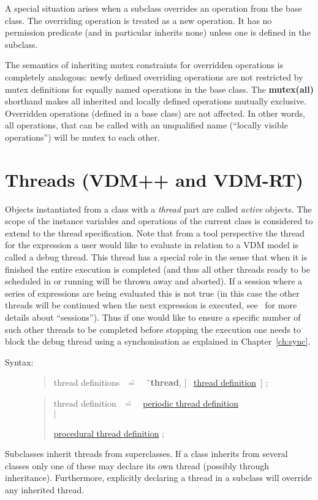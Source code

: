 \documentclass{overturerepchap}
\newcommand{\Rule}[2]{
  \begin{quote}\begin{tabbing}
    #1\index{#1}\ \ \= = \ \ \= #2  ; %
    
  \end{tabbing}\end{quote}
  }
\newcommand{\RuleTarget}[1]{\hypertarget{rule:#1}{}}
\newcommand{\Ruledef}[2]
{
  \RuleTarget{#1}\Rule{#1}{#2}%
  }
\newcommand{\Ruleref}[1]{
  \hyperlink{rule:#1}{#1}}
\newcommand{\dsep}{\\ \> $|$ \>}
\newcommand{\Lop}[1]{`{\bf\ttfamily #1}\Quote}
\newcommand{\keyw}[1]{{\bf\ttfamily #1}}
\newcommand{\OptPt}[1]{[\ #1\ ]}
\begin{document}
A special situation arises when a subclass overrides an
operation from the base class. The overriding operation is
treated as a new operation.  It has no permission predicate (and in
particular inherits none) unless one is defined in the subclass.

The semantics of inheriting mutex constraints for overridden
operations is completely analogous: newly defined overriding
operations are not restricted by mutex definitions for equally named
operations in the base class. The \keyw{mutex(all)} shorthand makes all
inherited and locally defined operations mutually
exclusive. Overridden operations (defined in a base class) are not
affected. In other words, all operations, that can be called with an
unqualified name (``locally visible operations'') will be mutex to
each other.

\chapter{Threads (VDM++ and VDM-RT)}\label{ch:thread}

Objects instantiated from a class with a {\em thread} part are called
{\em active} objects.  The scope of the instance variables and
operations of the current class is considered to extend to the thread
specification. Note that from a tool perspective the thread for the
expression a user would like to evaluate in relation to a VDM model is
called a debug thread. This thread has a special role in the sense
that when it is finished the entire execution is completed (and thus
all other threads ready to be scheduled in or running will be thrown
away and aborted). If a session where a series of expressions are
being evaluated this is not true (in this case the other threads will
be continued when the next expression is executed,
see~\cite{Larsen&10d} for more details about ``sessions'').
Thus if one would like to ensure a specific number
of such other threads to be completed before stopping the execution
one needs to block the debug thread using a synchonisation as
explained in Chapter~\ref{ch:sync}.

\begin{description}
\item[Syntax:]  \Ruledef{thread definitions}{ \Lop{thread},
\OptPt{\Ruleref{thread definition}} } \Rule{thread definition}{
    \Ruleref{periodic thread definition} \dsep 
    \Ruleref{procedural thread definition} }
\end{description}

Subclasses inherit threads from superclasses. 
If a class inherits from several classes only one of these may declare
its own thread (possibly through inheritance). Furthermore, explicitly
declaring a thread in a subclass will override any inherited thread.  
\end{document}
